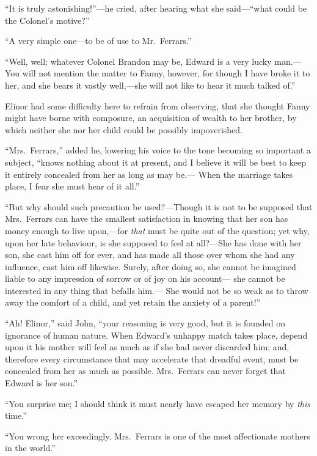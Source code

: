 ``It is truly astonishing!''---he cried, after hearing
what she said---``what could be the Colonel's motive?''

``A very simple one---to be of use to Mr.\ Ferrars.''

``Well, well; whatever Colonel Brandon may be,
Edward is a very lucky man.---You will not mention the matter
to Fanny, however, for though I have broke it to her,
and she bears it vastly well,---she will not like to hear
it much talked of.''

Elinor had some difficulty here to refrain from observing,
that she thought Fanny might have borne with composure,
an acquisition of wealth to her brother, by which neither
she nor her child could be possibly impoverished.

``Mrs.\ Ferrars,'' added he, lowering his voice to the
tone becoming so important a subject, ``knows nothing
about it at present, and I believe it will be best to
keep it entirely concealed from her as long as may be.---%
When the marriage takes place, I fear she must hear
of it all.''

``But why should such precaution be used?---Though
it is not to be supposed that Mrs.\ Ferrars can have
the smallest satisfaction in knowing that her son has
money enough to live upon,---for \emph{that} must be quite
out of the question; yet why, upon her late behaviour,
is she supposed to feel at all?---She has done with her
son, she cast him off for ever, and has made all those
over whom she had any influence, cast him off likewise.
Surely, after doing so, she cannot be imagined liable
to any impression of sorrow or of joy on his account---%
she cannot be interested in any thing that befalls him.---%
She would not be so weak as to throw away the comfort
of a child, and yet retain the anxiety of a parent!''

``Ah! Elinor,'' said John, ``your reasoning is very good,
but it is founded on ignorance of human nature.
When Edward's unhappy match takes place, depend upon it
his mother will feel as much as if she had never discarded him;
and, therefore every circumstance that may accelerate that
dreadful event, must be concealed from her as much as possible.
Mrs.\ Ferrars can never forget that Edward is her son.''

``You surprise me; I should think it must nearly
have escaped her memory by \emph{this} time.''

``You wrong her exceedingly.  Mrs.\ Ferrars is one
of the most affectionate mothers in the world.''

